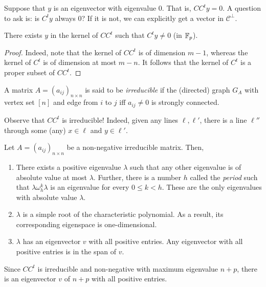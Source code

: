 \documentclass{article}
\begin{document}
	Suppose that $y$ is an eigenvector with eigenvalue $0$. That is, $CC^ty = 0$. A question to ask is: is $C^ty$ always $0$? If it is not, we can explicitly get a vector in $\mathcal{C}^\perp$.

	\begin{prop}
		There exists $y$ in the kernel of $CC^t$ such that $C^ty \ne 0$ (in $\mathbb{F}_p$).
	\end{prop}
	\begin{proof}
		Indeed, note that the kernel of $CC^t$ is of dimension $m-1$, whereas the kernel of $C^t$ is of dimension at most $m-n$. It follows that the kernel of $C^t$ is a proper subset of $CC^t$.
	\end{proof}

	\begin{definition}
		A matrix $A = (a_{ij})_{n \times n}$ is said to be \emph{irreducible} if the (directed) graph $G_A$ with vertex set $[n]$ and edge from $i$ to $j$ iff $a_{ij} \ne 0$ is strongly connected.
	\end{definition}

	Observe that $CC^t$ is irreducible! Indeed, given any lines $\ell,\ell'$, there is a line $\ell''$ through some (any) $x \in \ell$ and $y \in \ell'$.

	\begin{ftheo}
		Let $A = (a_{ij})_{n\times n}$ be a non-negative irreducible matrix. Then,
		\begin{enumerate}
			\item There exists a positive eigenvalue $\lambda$ such that any other eigenvalue is of absolute value at most $\lambda$. Further, there is a number $h$ called the \emph{period} such that $\lambda \omega_h^k \lambda$ is an eigenvalue for every $0 \le k < h$. These are the only eigenvalues with absolute value $\lambda$.
			\item $\lambda$ is a simple root of the characteristic polynomial. As a result, its corresponding eigenspace is one-dimensional.
			\item $\lambda$ has an eigenvector $v$ with all positive entries. Any eigenvector with all positive entries is in the span of $v$.
		\end{enumerate}
	\end{ftheo}

	Since $CC^t$ is irreducible and non-negative with maximum eigenvalue $n+p$, there is an eigenvector $v$ of $n+p$ with all positive entries.
\end{document}
